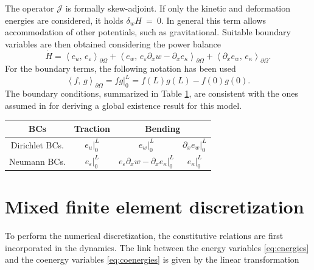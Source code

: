 \documentclass{ifacconf}
\newcommand{\inner}[3][]{\ensuremath{\left\langle #2, \, #3 \right\rangle_{#1}}}
\begin{document}
The operator $\mathcal{J}$ is formally skew-adjoint. If only the kinetic and deformation energies are considered, it holds $\delta_{w} H~=~0$. In general this term allows
accommodation of other potentials, such as gravitational. Suitable boundary variables are then obtained considering the power balance
\begin{equation}\label{eq:pow_bal}
	\dot{H} = \inner[\partial\Omega]{e_u}{e_\varepsilon} + \inner[\partial\Omega]{e_w}{e_\varepsilon \partial_x w -\partial_x e_\kappa} + \inner[\partial\Omega]{\partial_x e_w}{e_\kappa}.
\end{equation}
For the boundary terms, the following notation has been used
\begin{equation*}
	\inner[\partial\Omega]{f}{g} = f g \vert_{0}^L = f(L)g(L) - f(0)g(0).
\end{equation*} 
The boundary conditions, summarized in Table \ref{tab:bcs}, are consistent with the ones assumed in \cite{puel1996} for deriving a global existence result for this model.


\begin{table}[h]
	\centering
	\begin{tabular}{c|c|cc}
		\hline 
		BCs & Traction & \multicolumn{2}{c}{Bending} \\ 
		\hline 
		Dirichlet BCs. & $e_u\vert_0^L$ & $e_w\vert_0^L$  & $\partial_x e_w\vert_0^L$  \\
		Neumann BCs. & $e_\varepsilon\vert_0^L$ & $e_\varepsilon \partial_x w -\partial_x e_\kappa\vert_0^L$ & $e_\kappa\vert_0^L$ \\ 
		\hline 
	\end{tabular} 
	\captionsetup{width=0.95\linewidth}
	\vspace{1mm}
	\label{tab:bcs}
\end{table}

\section{Mixed finite element discretization}\label{sec:mfem}
To perform the numerical discretization, the constitutive relations are first incorporated in the dynamics. The link between the energy variables \eqref{eq:energies} and the coenergy variables \eqref{eq:coenergies} is given by the linear transformation
\end{document}
